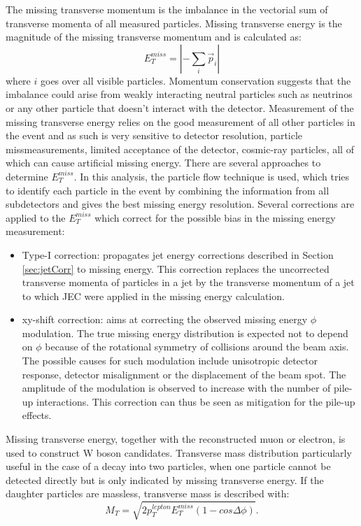 The missing transverse momentum is the imbalance in the vectorial sum of transverse momenta of all measured particles. Missing transverse energy is the magnitude of the missing transverse momentum and is calculated as:
\begin{equation}
E_T^{miss}= |-\sum_{i} \vec{p}_i|
\end{equation}
where $i$ goes over all visible particles. Momentum conservation suggests that the imbalance could arise from weakly interacting neutral particles such as neutrinos or any other particle that doesn't interact with the detector. Measurement of the missing transverse energy relies on the good measurement of all other particles in the event and as such is very sensitive to detector resolution, particle missmeasurements, limited acceptance of the detector, cosmic-ray particles, all of which can cause artificial missing energy. There are several approaches to determine $E_T^{miss}$. In this analysis, the particle flow technique is used, which tries to identify each particle in the event by combining the information from all subdetectors and gives the best missing energy resolution.\cite{CMS-PAS-PFT-09-001,Chatrchyan:2011tn} Several corrections are applied to the $E_T^{miss}$ which correct for the possible bias in the missing energy measurement:
\begin{itemize}
\item Type-I correction: propagates jet energy corrections described in Section \ref{sec:jetCorr} to missing energy. This correction replaces the uncorrected transverse momenta of particles in a jet by the transverse momentum of a jet to which JEC were applied in the missing energy calculation.
\item xy-shift correction: aims at correcting the observed missing energy $\phi$ modulation. The true missing energy distribution is expected not to depend on $\phi$ because of the rotational symmetry of collisions around the beam axis. The possible causes for such modulation  include unisotropic detector response, detector misalignment or the displacement of the beam spot. The amplitude of the modulation is observed to increase with the number of pile-up interactions. This correction can thus be seen as mitigation for the pile-up effects.
\end{itemize}
Missing transverse energy, together with the reconstructed muon or electron, is used to construct W boson candidates. Transverse mass distribution particularly useful in the case of a decay into two particles, when one particle cannot be detected directly but is only indicated by missing transverse energy. If the daughter particles are massless, transverse mass is described with:   
\begin{equation}
M_T=\sqrt{2p_T^{lepton}E_T^{miss}(1-cos\Delta \phi)}.
\end{equation}




